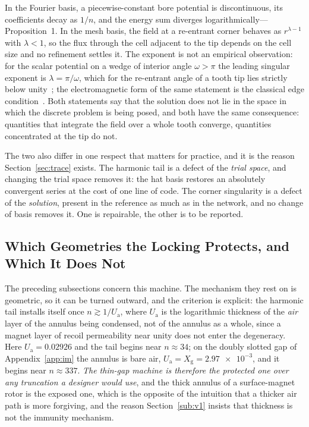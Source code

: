 \documentclass[10pt,a4paper,twocolumn]{article}
\newcommand{\Ua}{U_{\mathrm{a}}}
\newcommand{\Xg}{X_{\mathrm{g}}}
\theoremstyle{plain}
\theoremstyle{remark}
\begin{document}
In the Fourier basis, a piecewise-constant bore potential is
discontinuous, its coefficients decay as $1/n$, and the energy sum
diverges logarithmically---Proposition~1. In the mesh basis, the field
at a re-entrant corner behaves as $r^{\lambda-1}$ with $\lambda<1$, so
the flux through the cell adjacent to the tip depends on the cell size
and no refinement settles it. The exponent is not an empirical
observation: for the scalar potential on a wedge of interior angle
$\omega>\pi$ the leading singular exponent is $\lambda=\pi/\omega$,
which for the re-entrant angle of a tooth tip lies strictly below
unity~\cite{grisvard1985}; the electromagnetic form of the same
statement is the classical edge condition~\cite{meixner1972}. Both statements say that the solution does
not lie in the space in which the discrete problem is being posed, and
both have the same consequence: quantities that integrate the field over
a whole tooth converge, quantities concentrated at the tip do not.

The two also differ in one respect that matters for practice, and it is
the reason Section~\ref{sec:trace} exists. The harmonic tail is a defect
of the \emph{trial space}, and changing the trial space removes it: the
hat basis restores an absolutely convergent series at the cost of one
line of code. The corner singularity is a defect of the \emph{solution},
present in the reference as much as in the network, and no change of
basis removes it. One is repairable, the other is to be reported.

\subsection{Which Geometries the Locking Protects, and Which It Does Not}
\label{sub:generality}

The preceding subsections concern this machine. The mechanism they rest
on is geometric, so it can be turned outward, and the criterion is
explicit: the harmonic tail installs itself once $n\gtrsim1/\Ua$, where
$\Ua$ is the logarithmic thickness of the \emph{air} layer of the
annulus being condensed, not of the annulus as a whole, since a magnet
layer of recoil permeability near unity does not enter the degeneracy.
Here $\Ua=\num{0.02926}$ and the tail begins near $n\approx34$; on the
doubly slotted gap of Appendix~\ref{app:im} the annulus is bare air,
$\Ua=\Xg=\num{2.97e-3}$, and it begins near $n\approx337$. \emph{The thin-gap machine is therefore the
protected one over any truncation a designer would use}, and the thick
annulus of a surface-magnet rotor is the exposed one, which is the
opposite of the intuition that a thicker air path is more forgiving, and
the reason Section~\ref{sub:v1} insists that thickness is not the
immunity mechanism.
\end{document}

